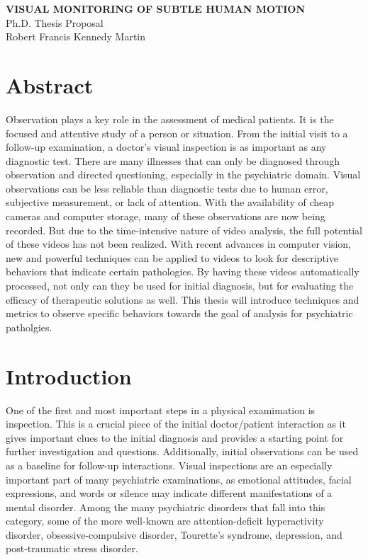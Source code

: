 \documentclass[11pt]{article}
\begin{document}

%
\newpage
\thispagestyle{empty}
\begin{center}
\textbf{VISUAL MONITORING OF SUBTLE HUMAN MOTION}\\
Ph.D. Thesis Proposal\\
\bigskip
Robert Francis Kennedy Martin\\
\end{center}
\clearpage
{}
\section{Abstract}
\noindent
Observation plays a key role in the assessment of medical patients. It is the focused and attentive study of a person or situation. From the initial visit to a follow-up examination, a doctor’s visual inspection is as important as any diagnostic test. There are many illnesses that can only be diagnosed through observation and directed questioning, especially in the psychiatric domain. Visual observations can be less reliable than diagnostic tests due to human error, subjective measurement, or lack of attention. With the availability of cheap cameras and computer storage, many of these observations are now being recorded. But due to the time-intensive nature of video analysis, the full potential of these videos has not been realized. With recent advances in computer vision, new and powerful techniques can be applied to videos to look for descriptive behaviors that indicate certain pathologies. By having these videos automatically processed, not only can they be used for initial diagnosis, but for evaluating the efficacy of therapeutic solutions as well. This thesis will introduce techniques and metrics to observe specific behaviors towards the goal of analysis for psychiatric patholgies.
\section{Introduction}
\noindent
One of the first and most important steps in a physical examimation is inspection. This is a crucial piece of the initial doctor/patient interaction as it gives important clues to the initial diagnosis and provides a starting point for further investigation and questions. Additionally, initial observations can be used as a baseline for follow-up interactions. Visual inspections are an especially important part of many psychiatric examinations, as emotional attitudes, facial expressions, and words or silence may indicate different manifestations of a mental disorder. Among the many psychiatric disorders that fall into this category, some of the more well-known are attention-deficit hyperactivity disorder, obsessive-compulsive disorder, Tourette's syndrome, depression, and post-traumatic stress disorder.
\end{document}
